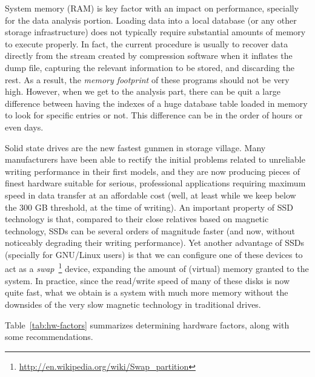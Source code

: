 System memory (RAM) is key factor with an impact on performance, specially
for the data analysis portion. Loading data into a local database (or any other
storage infrastructure) does not typically require substantial amounts of memory
to execute properly. In fact, the current procedure is usually to recover
data directly from the stream created by compression software when it inflates the
dump file, capturing the relevant information to be stored, and discarding
the rest. As a result, the \textit{memory footprint} of these programs should not
be very high. However, when we get to the analysis part, there can be quit a large
difference between having the indexes of a huge database table loaded in memory to look
for specific entries or not. This difference can be in the order of
hours or even days.

Solid state drives are the new fastest gunmen in storage village. Many manufacturers
have been able to rectify the initial problems related to unreliable writing performance
in their first models, and they are now producing pieces of finest hardware suitable
for serious, professional applications requiring maximum speed in data transfer
at an affordable cost (well, at least while we keep below the 300 GB threshold,
at the time of writing). An important property of SSD technology is that, compared
to their close relatives based on magnetic technology, SSDs can be several orders
of magnitude faster (and now, without noticeably degrading their writing performance).
Yet another advantage of SSDs (specially for GNU/Linux users) is that we can
configure one of these devices to act as a 
\textit{swap}~\footnote{\url{http://en.wikipedia.org/wiki/Swap_partition}}
device, expanding the amount of (virtual) memory granted to the system. In practice,
since the read/write speed of many of these disks is now quite fast, what we
obtain is a system with much more memory without the downsides of the very slow
magnetic technology in traditional drives.

Table~\ref{tab:hw-factors} summarizes determining hardware factors, along with 
some recommendations.

